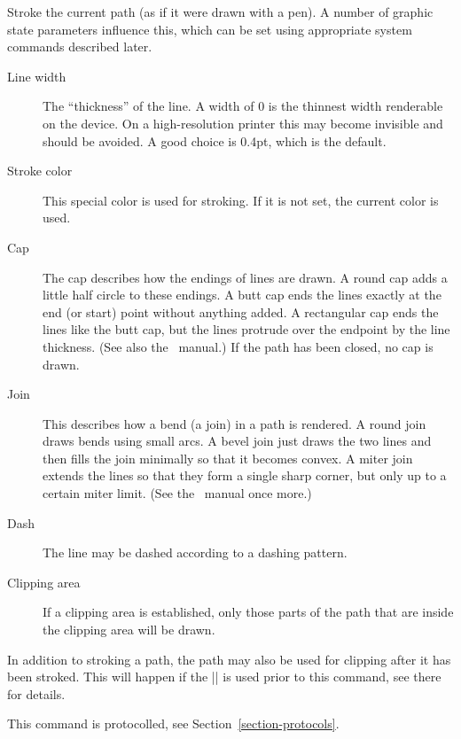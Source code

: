 \begin{command}{\pgfsys@stroke}
  Stroke the current path (as if it were drawn with a pen). A number
  of graphic state parameters influence this, which can be
  set using appropriate system commands described later.

  \begin{description}
  \item[Line width]
    The ``thickness'' of the line. A width of 0 is the thinnest width
    renderable on the device. On a high-resolution printer this may
    become invisible and should be avoided. A good choice is 0.4pt,
    which is the default.

  \item[Stroke color]
    This special color is used for stroking. If it is not set, the
    current color is used.

  \item[Cap]
    The cap describes how the endings of lines are drawn. A round cap
    adds a little half circle to these endings. A butt cap ends the
    lines exactly at the end (or start) point without anything
    added. A rectangular cap ends the lines like the butt cap, but the
    lines protrude over the endpoint by the line thickness. (See also
    the \pdf\ manual.) If the path has been closed, no cap
    is drawn.

  \item[Join]
    This describes how a bend (a join) in a path is rendered. A round
    join draws bends using small arcs. A bevel join just draws the two
    lines and then fills the join minimally so that it becomes
    convex. A miter join extends the lines so that they form a single
    sharp corner, but only up to a certain miter limit. (See the \pdf\
    manual once more.)

  \item[Dash]
    The line may be dashed according to a dashing pattern.

  \item[Clipping area]
    If a clipping area is established, only those parts of the path
    that are inside the clipping area will be drawn.
  \end{description}

  In addition to stroking a path, the path may also be used for
  clipping after it has been stroked. This will happen if the
  |\pgfsys@clipnext| is used prior to this command, see there for
  details.

  This command is protocolled, see Section~\ref{section-protocols}.
\end{command}


